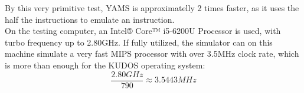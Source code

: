 %
%
%
%
%

By this very primitive test, YAMS is approximatelly 2 times faster, as it uses
the half the instructions to emulate an instruction.\\
On the testing computer, an Intel® Core™ i5-6200U Processor is used, with turbo
frequency up to 2.80GHz\cite{intel:i5}. If fully utilized, the simulator can on
this machine simulate a very fast MIPS processor with over 3.5MHz clock rate,
which is more than enough for the KUDOS operating system:
$$\frac{2.80\mathit{ GHz}}{790} \approx 3.5443\mathit{ MHz}$$


